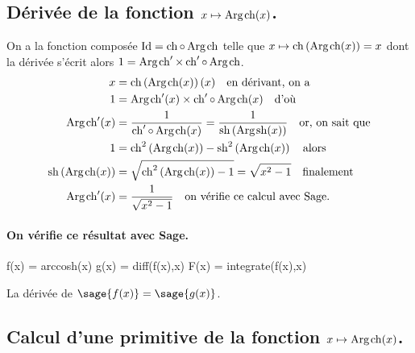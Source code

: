 \documentclass[a4paper,landscape,17pt]{extreport} %
\def\Id{\ensuremath{\mathrm{Id}}}
\renewcommand{\sinh}{\mathop{\mathrm{sh}}}
\renewcommand{\cosh}{\mathop{\mathrm{ch}}}
\renewcommand{\arg}{\mathop{\mathrm{Arg}}}
\begin{document}
\subsection{Dérivée de la fonction $x \mapsto \arg\mspace{-1mu}\cosh(x)$.\label{argcosh}}
On a la fonction composée $\Id = \cosh \circ \arg\mspace{-1mu}\cosh$ telle que $x\mapsto\cosh\left(\arg\mspace{-1mu}\cosh(x)\right)=x$ dont la dérivée s'écrit alors $1= \arg\mspace{-1mu}\cosh\nolimits' \times \cosh\nolimits'\circ\arg\mspace{-1mu}\cosh$.
\begin{align*}
x & =\cosh\left(\arg\mspace{-1mu}\cosh(x)\right)(x) \quad \textrm{en dérivant, on a}\\
1 & = \arg\mspace{-1mu}\cosh\nolimits'(x) \times \cosh\nolimits'\circ\arg\mspace{-1mu}\cosh(x) \quad \textrm{d'où}\\
\arg\mspace{-1mu}\cosh\nolimits'(x) & =\frac{1}{ \cosh\nolimits'\circ\arg\mspace{-1mu}\cosh(x)}=\frac{1}{ \sinh\left(\arg\mspace{-1mu}\sinh(x)\right)}\quad \textrm{or, on sait que}\\
1 & = \cosh\nolimits^2\left(\arg\mspace{-1mu}\cosh(x)\right) - \sinh\nolimits^2\left(\arg\mspace{-1mu}\cosh(x)\right) \quad \textrm{alors}\\
\sinh\left(\arg\mspace{-1mu}\cosh(x)\right) & = \sqrt{\cosh\nolimits^2\left(\arg\mspace{-1mu}\cosh(x)\right)-1}=\sqrt{x^2-1}\quad \textrm{finalement}\\
\arg\mspace{-1mu}\cosh\nolimits'(x) & = \frac{1}{ \sqrt{x^2-1}}\quad \textrm{on vérifie ce calcul avec Sage.}
\end{align*}


\paragraph{On vérifie ce résultat avec Sage.}



\begin{sageblock}
    f(x) = arccosh(x)
    g(x) = diff(f(x),x)
    F(x) = integrate(f(x),x)
\end{sageblock}

La dérivée de $\sage{f(x)} = \sage{g(x)} $.


\subsection{Calcul d'une primitive de la fonction  $x \mapsto \arg\mspace{-1mu}\cosh(x)$.}
\end{document}
